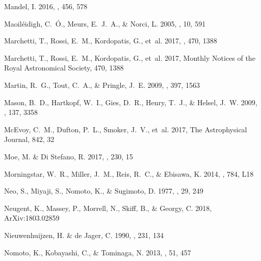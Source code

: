 \documentclass{aa}
\begin{document}
\begin{thebibliography}{242}
{Mandel}, I. 2016, \mnras, 456, 578

{Maoil{\'e}idigh}, C.~{\'O}., {Meurs}, E.~J.~A., \& {Norci}, L. 2005, \na, 10,
  591

{Marchetti}, T., {Rossi}, E.~M., {Kordopatis}, G., {et~al.} 2017, \mnras, 470,
  1388

Marchetti, T., Rossi, E.~M., Kordopatis, G., {et~al.} 2017, Monthly Notices of
  the Royal Astronomical Society, 470, 1388

{Martin}, R.~G., {Tout}, C.~A., \& {Pringle}, J.~E. 2009, \mnras, 397, 1563

{Mason}, B.~D., {Hartkopf}, W.~I., {Gies}, D.~R., {Henry}, T.~J., \& {Helsel},
  J.~W. 2009, \aj, 137, 3358

McEvoy, C.~M., Dufton, P.~L., Smoker, J.~V., {et~al.} 2017, The Astrophysical
  Journal, 842, 32

{Moe}, M. \& {Di Stefano}, R. 2017, \apjs, 230, 15

{Morningstar}, W.~R., {Miller}, J.~M., {Reis}, R.~C., \& {Ebisawa}, K. 2014,
  \apjl, 784, L18

{Neo}, S., {Miyaji}, S., {Nomoto}, K., \& {Sugimoto}, D. 1977, \pasj, 29, 249

{Neugent}, K., {Massey}, P., {Morrell}, N., {Skiff}, B., \& {Georgy}, C. 2018,
  ArXiv:1803.02859

{Nieuwenhuijzen}, H. \& {de Jager}, C. 1990, \aap, 231, 134

{Nomoto}, K., {Kobayashi}, C., \& {Tominaga}, N. 2013, \araa, 51, 457


\end{thebibliography}
\end{document}
